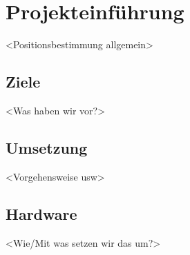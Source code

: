 
\chapter{Projekteinführung}
<Positionsbestimmung allgemein>

\section{Ziele}
<Was haben wir vor?>

\section{Umsetzung}
<Vorgehensweise usw>

\section{Hardware}
<Wie/Mit was setzen wir das um?>


